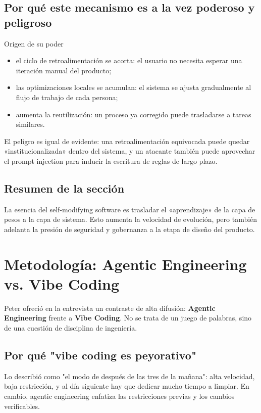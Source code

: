 \documentclass[a4paper]{article}
\begin{document}
\subsection{Por qué este mecanismo es a la vez poderoso y peligroso}

\begin{knowledgebox}{Origen de su poder}
\begin{itemize}
    \item el ciclo de retroalimentación se acorta: el usuario no necesita esperar una iteración manual del producto;
    \item las optimizaciones locales se acumulan: el sistema se ajusta gradualmente al flujo de trabajo de cada persona;
    \item aumenta la reutilización: un proceso ya corregido puede trasladarse a tareas similares.
\end{itemize}
\end{knowledgebox}

El peligro es igual de evidente: una retroalimentación equivocada puede quedar «institucionalizada» dentro del sistema, y un atacante también puede aprovechar el prompt injection para inducir la escritura de reglas de largo plazo.

\subsection{Resumen de la sección}
La esencia del self-modifying software es trasladar el «aprendizaje» de la capa de pesos a la capa de sistema. Esto aumenta la velocidad de evolución, pero también adelanta la presión de seguridad y gobernanza a la etapa de diseño del producto.

\section{Metodología: Agentic Engineering vs. Vibe Coding}

Peter ofreció en la entrevista un contraste de alta difusión: \textbf{Agentic Engineering} frente a \textbf{Vibe Coding}. No se trata de un juego de palabras, sino de una cuestión de disciplina de ingeniería.

\subsection{Por qué "vibe coding es peyorativo"}

Lo describió como "el modo de después de las tres de la mañana": alta velocidad, baja restricción, y al día siguiente hay que dedicar mucho tiempo a limpiar. En cambio, agentic engineering enfatiza las restricciones previas y los cambios verificables.
\end{document}
